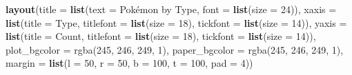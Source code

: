 \documentclass[
]{article}
\newenvironment{Shaded}{\begin{snugshade}}{\end{snugshade}}
\newcommand{\AttributeTok}[1]{\textcolor[rgb]{0.13,0.29,0.53}{#1}}
\newcommand{\DecValTok}[1]{\textcolor[rgb]{0.00,0.00,0.81}{#1}}
\newcommand{\FunctionTok}[1]{\textcolor[rgb]{0.13,0.29,0.53}{\textbf{#1}}}
\newcommand{\NormalTok}[1]{#1}
\newcommand{\StringTok}[1]{\textcolor[rgb]{0.31,0.60,0.02}{#1}}
\begin{document}
\begin{Shaded}
\begin{Highlighting}[]
\FunctionTok{layout}\NormalTok{(}\AttributeTok{title =} \FunctionTok{list}\NormalTok{(}\AttributeTok{text =} \StringTok{\textquotesingle{}Pokémon by Type\textquotesingle{}}\NormalTok{, }\AttributeTok{font =} \FunctionTok{list}\NormalTok{(}\AttributeTok{size =} \DecValTok{24}\NormalTok{)),}
       \AttributeTok{xaxis =} \FunctionTok{list}\NormalTok{(}\AttributeTok{title =} \StringTok{\textquotesingle{}Type\textquotesingle{}}\NormalTok{, }\AttributeTok{titlefont =} \FunctionTok{list}\NormalTok{(}\AttributeTok{size =} \DecValTok{18}\NormalTok{), }\AttributeTok{tickfont =} \FunctionTok{list}\NormalTok{(}\AttributeTok{size =} \DecValTok{14}\NormalTok{)),}
       \AttributeTok{yaxis =} \FunctionTok{list}\NormalTok{(}\AttributeTok{title =} \StringTok{\textquotesingle{}Count\textquotesingle{}}\NormalTok{, }\AttributeTok{titlefont =} \FunctionTok{list}\NormalTok{(}\AttributeTok{size =} \DecValTok{18}\NormalTok{), }\AttributeTok{tickfont =} \FunctionTok{list}\NormalTok{(}\AttributeTok{size =} \DecValTok{14}\NormalTok{)),}
       \AttributeTok{plot\_bgcolor =} \StringTok{\textquotesingle{}rgba(245, 246, 249, 1)\textquotesingle{}}\NormalTok{,}
       \AttributeTok{paper\_bgcolor =} \StringTok{\textquotesingle{}rgba(245, 246, 249, 1)\textquotesingle{}}\NormalTok{,}
       \AttributeTok{margin =} \FunctionTok{list}\NormalTok{(}\AttributeTok{l =} \DecValTok{50}\NormalTok{, }\AttributeTok{r =} \DecValTok{50}\NormalTok{, }\AttributeTok{b =} \DecValTok{100}\NormalTok{, }\AttributeTok{t =} \DecValTok{100}\NormalTok{, }\AttributeTok{pad =} \DecValTok{4}\NormalTok{))}
\end{Highlighting}
\end{Shaded}
\end{document}
